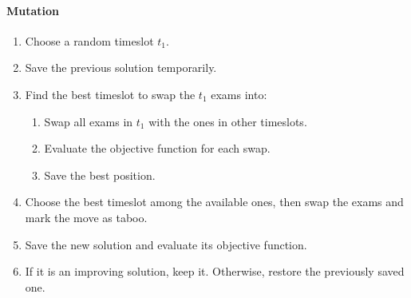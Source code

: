 \paragraph*{Mutation}
\begin{enumerate}
\item Choose a random timeslot $t_1$.
\item Save the previous solution temporarily.
\item Find the best timeslot to swap the $t_1$ exams into:
\begin{enumerate}
\item Swap all exams in $t_1$ with the ones in other timeslots.
\item Evaluate the objective function for each swap.
\item Save the best position.
\end{enumerate}
\item Choose the best timeslot among the available ones, then swap the exams and mark the move as taboo.
\item Save the new solution and evaluate its objective function.
\item If it is an improving solution, keep it. Otherwise, restore the previously saved one.
\end{enumerate}
